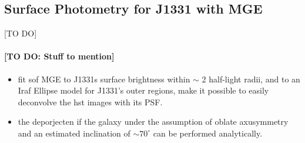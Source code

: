 \subsection{Surface Photometry for J1331 with MGE}

[TO DO]

\paragraph{[TO DO: Stuff to mention]}
\begin{itemize}
\item fit sof MGE to J1331s surface brightness within $\sim$ 2 half-light radii, and to an Iraf Ellipse model for J1331's outer regions, make it possible to easily deconvolve the hst images with its PSF.
\item the deporjecten if the galaxy under the assumption of oblate axusymmetry and an estimated inclination of $\sim70^\circ$ can be performed analytically.
\end{itemize}


